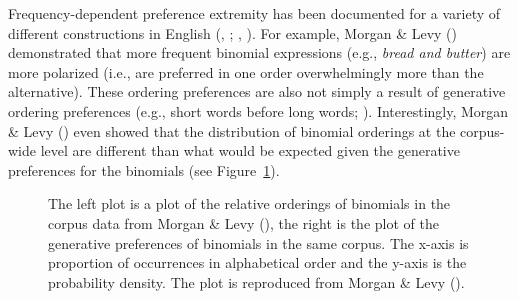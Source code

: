 \documentclass[
  12pt,
  letterpaper,
]{scrreport}
\begin{document}
Frequency-dependent preference extremity has been documented for a
variety of different constructions in English
(,
;
,
).
For example, Morgan \& Levy ()
demonstrated that more frequent binomial expressions (e.g.,
\emph{bread and butter}) are more polarized (i.e., are preferred in one
order overwhelmingly more than the alternative). These ordering
preferences are also not simply a result of generative ordering
preferences (e.g., short words before long words;
). Interestingly, Morgan \& Levy
()
even showed that the distribution of binomial orderings at the
corpus-wide level are different than what would be expected given the
generative preferences for the binomials (see
Figure~\ref{fig-corpusplot1}).

\begin{figure}[htbp]

\caption{\label{fig-corpusplot1}The left plot is a plot of the relative
orderings of binomials in the corpus data from Morgan \& Levy
(), the right is the plot of the
generative preferences of binomials in the same corpus. The x-axis is
proportion of occurrences in alphabetical order and the y-axis is the
probability density. The plot is reproduced from Morgan \& Levy
().}


\end{figure}%
\end{document}
